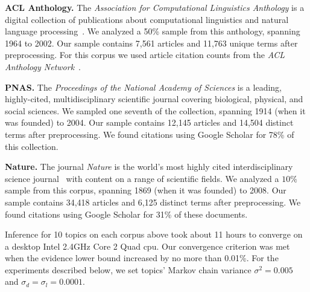 \textbf{ACL Anthology.} The \emph{Association for Computational
  Linguistics Anthology} is a digital collection of publications about
computational linguistics and natural language
processing~\cite{bird:2008}.  We analyzed a 50\% sample from this
anthology, spanning 1964 to 2002.  Our sample contains 7,561
articles and 11,763 unique terms after preprocessing.  For this corpus
we used article citation counts from the \emph{ACL Anthology
  Network}~\cite{Radev:2009}.

\textbf{PNAS.} The \emph{Proceedings of the National Academy of
  Sciences} is a leading, highly-cited, multidisciplinary scientific
journal covering biological, physical, and social sciences.  We
sampled one seventh of the collection, spanning 1914 (when it was
founded) to 2004.  Our sample contains 12,145 articles and 14,504
distinct terms after preprocessing.  We found citations using Google
Scholar for 78\% of this collection.

\textbf{Nature.} The journal \emph{Nature} is the world's most highly
cited interdisciplinary science journal~\cite{Thompson:2009} with
content on a range of scientific fields. We analyzed a $10\%$
sample from this corpus, spanning 1869 (when it was founded) to
2008.  Our sample contains 34,418 articles and 6,125 distinct terms
after preprocessing.  We found citations using Google Scholar for 31\%
of these documents.

Inference for 10 topics on each corpus above took about 11 hours to
converge on a desktop Intel 2.4GHz Core 2 Quad cpu.  Our convergence
criterion was met when the evidence lower bound increased by no more
than 0.01\%.  For the experiments described below, we set topics'
Markov chain variance $\sigma^2=0.005$ and $\sigma_d=\sigma_l=0.0001$.



